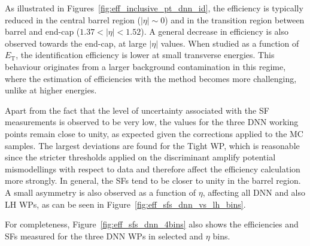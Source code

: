 As illustrated in Figures~\ref{fig:eff_inclusive_pt_dnn_id}, the efficiency is typically reduced in the central barrel region ($|\eta|\sim0$) and in the transition region between barrel and end-cap ($1.37 < |\eta| < 1.52$). A general decrease in efficiency is also observed towards the end-cap, at large $|\eta|$ values. When studied as a function of $E_{\mathrm{T}}$, the identification efficiency is lower at small transverse energies. This behaviour originates from a larger background contamination in this regime, where the estimation of efficiencies with the \zmass method becomes more challenging, unlike at higher energies.

Apart from the fact that the level of uncertainty associated with the SF measurements is observed to be very low, 
the values for the three DNN working points remain close to unity, 
as expected given the corrections applied to the MC samples. The largest deviations are found for the Tight WP, which is reasonable since the stricter thresholds applied on the discriminant amplify potential mismodellings with respect to data and therefore affect the efficiency calculation more strongly. In general, the SFs tend to be closer to unity in the barrel region. A small asymmetry is also observed as a function of $\eta$, affecting all DNN and also LH WPs, as can be seen in Figure~\ref{fig:eff_sfs_dnn_vs_lh_bins}.

For completeness, Figure~\ref{fig:eff_sfs_dnn_4bins} also shows the efficiencies and SFs measured for the three DNN WPs in selected \et and $\eta$ bins.

